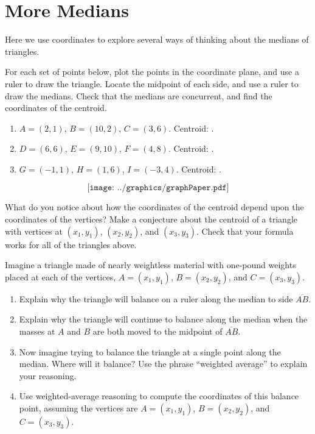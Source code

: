\newpage

\section{More Medians}
Here we use coordinates to explore several ways of thinking about the medians of triangles.  

\begin{prob}
For each set of points below, plot the points in the coordinate plane, and use a ruler to draw the triangle.  Locate the midpoint of each side, and use a ruler to draw the medians.   Check that the medians are concurrent, and find the coordinates of the centroid.  
\begin{enumerate}
\setlength{\itemsep}{4pt}
\item $A=(2, 1)$, $B=(10, 2)$, $C=(3, 6)$.  Centroid: \underline{\hspace{1.5cm}}. 
\item $D=(6, 6)$, $E=(9, 10)$, $F=(4, 8)$.  Centroid: \underline{\hspace{1.5cm}}. 
\item $G=(-1, 1)$, $H=(1, 6)$, $I=(-3, 4)$.  Centroid: \underline{\hspace{1.5cm}}. 
\end{enumerate}

$$\texttt{[image: ../graphics/graphPaper.pdf]}$$

\end{prob}

\begin{prob}
What do you notice about how the coordinates of the centroid depend upon the coordinates of the vertices?  Make a conjecture about the centroid of a triangle with vertices at $(x_1, y_1)$, $(x_2, y_2)$, and $(x_3, y_3)$.  Check that your formula works for all of the triangles above.
\end{prob}

\begin{prob}
Imagine a triangle made of nearly weightless material with one-pound weights placed at each of the vertices, $A=(x_1, y_1)$, $B=(x_2, y_2)$, and $C=(x_3, y_3)$.  
\begin{enumerate}
\item Explain why the triangle will balance on a ruler along the median to side $\overline{AB}$.  
\item Explain why the triangle will continue to balance along the median when the masses at $A$ and $B$ are both moved to the midpoint of $\overline{AB}$.  
\item Now imagine trying to balance the triangle at a single point along the median.  Where will it balance?  Use the phrase ``weighted average'' to explain your reasoning.   
\item Use weighted-average reasoning to compute the coordinates of this balance point, assuming the vertices are $A=(x_1, y_1)$, $B=(x_2, y_2)$, and $C=(x_3, y_3)$.
\end{enumerate}
\end{prob}

